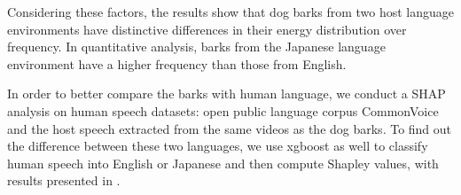 

Considering these factors, the results show that dog barks from two host language environments have distinctive differences in their energy distribution over frequency. In quantitative analysis, barks from the Japanese language environment have a higher frequency than those from English.

In order to better compare the barks with human language, we conduct a SHAP analysis on 
human speech datasets: open public language corpus CommonVoice and the host speech 
extracted from the same videos as the dog barks. 
To find out the difference between these two languages, we use xgboost as well to classify 
human speech into English or Japanese and then compute Shapley values, 
with results presented in .


